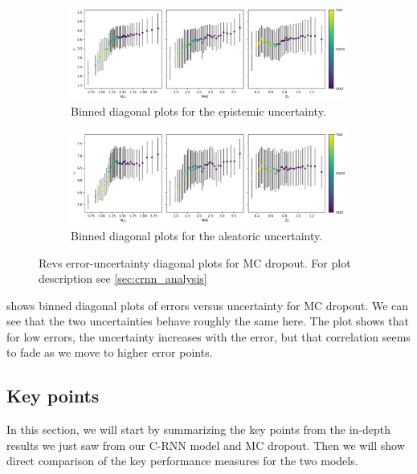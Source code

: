 \begin{figure}[htbp]
  \centering
    \begin{subfigure}[b]{\textwidth}
        \includegraphics[width=\textwidth]{Experiments/figs/binned/revs_dropout_epistemic.png}
        \caption{Binned diagonal plots for the epistemic uncertainty.}
    \end{subfigure}
    
    \begin{subfigure}[b]{\textwidth}
        \includegraphics[width=\textwidth]{Experiments/figs/binned/revs_dropout_aleatoric.png}
        \caption{Binned diagonal plots for the aleatoric uncertainty.}
  \end{subfigure}
    \caption[Revs error-uncertainty diagonal plots for MC dropout]{Revs error-uncertainty diagonal plots for MC dropout. For plot description see \cref{sec:crnn_analysis}}
    \label{fig:revs_dropout_uncertainty_corr}
\end{figure}

 shows binned diagonal plots of errors versus uncertainty for MC dropout. We can see that the two uncertainties behave roughly the same here. The plot shows that for low errors, the uncertainty increases with the error, but that correlation seems to fade as we move to higher error points. 


\subsection{Key points}

In this section, we will start by summarizing the key points from the in-depth results we just saw from our C-RNN model and MC dropout. Then we will show direct comparison of the key performance measures for the two models.

